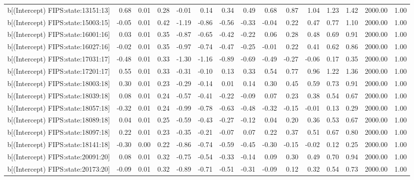 \begin{table}[ht]
\begin{tabular}{rrrrrrrrrrrrrrr}
  b[(Intercept) FIPS:state:13151:13] & 0.68 & 0.01 & 0.28 & -0.01 & 0.14 & 0.34 & 0.49 & 0.68 & 0.87 & 1.04 & 1.23 & 1.42 & 2000.00 & 1.00 \\ 
  b[(Intercept) FIPS:state:15003:15] & -0.05 & 0.01 & 0.42 & -1.19 & -0.86 & -0.56 & -0.33 & -0.04 & 0.22 & 0.47 & 0.77 & 1.10 & 2000.00 & 1.00 \\ 
  b[(Intercept) FIPS:state:16001:16] & 0.03 & 0.01 & 0.35 & -0.87 & -0.65 & -0.42 & -0.22 & 0.06 & 0.28 & 0.48 & 0.69 & 0.91 & 2000.00 & 1.00 \\ 
  b[(Intercept) FIPS:state:16027:16] & -0.02 & 0.01 & 0.35 & -0.97 & -0.74 & -0.47 & -0.25 & -0.01 & 0.22 & 0.41 & 0.62 & 0.86 & 2000.00 & 1.00 \\ 
  b[(Intercept) FIPS:state:17031:17] & -0.48 & 0.01 & 0.33 & -1.30 & -1.16 & -0.89 & -0.69 & -0.49 & -0.27 & -0.06 & 0.17 & 0.35 & 2000.00 & 1.00 \\ 
  b[(Intercept) FIPS:state:17201:17] & 0.55 & 0.01 & 0.33 & -0.31 & -0.10 & 0.13 & 0.33 & 0.54 & 0.77 & 0.96 & 1.22 & 1.36 & 2000.00 & 1.00 \\ 
  b[(Intercept) FIPS:state:18003:18] & 0.30 & 0.01 & 0.23 & -0.29 & -0.14 & 0.01 & 0.14 & 0.30 & 0.45 & 0.59 & 0.73 & 0.91 & 2000.00 & 1.00 \\ 
  b[(Intercept) FIPS:state:18039:18] & 0.08 & 0.01 & 0.24 & -0.57 & -0.41 & -0.22 & -0.09 & 0.07 & 0.23 & 0.38 & 0.54 & 0.67 & 2000.00 & 1.00 \\ 
  b[(Intercept) FIPS:state:18057:18] & -0.32 & 0.01 & 0.24 & -0.99 & -0.78 & -0.63 & -0.48 & -0.32 & -0.15 & -0.01 & 0.13 & 0.29 & 2000.00 & 1.00 \\ 
  b[(Intercept) FIPS:state:18089:18] & 0.04 & 0.01 & 0.25 & -0.59 & -0.43 & -0.27 & -0.12 & 0.04 & 0.20 & 0.36 & 0.53 & 0.67 & 2000.00 & 1.00 \\ 
  b[(Intercept) FIPS:state:18097:18] & 0.22 & 0.01 & 0.23 & -0.35 & -0.21 & -0.07 & 0.07 & 0.22 & 0.37 & 0.51 & 0.67 & 0.80 & 2000.00 & 1.00 \\ 
  b[(Intercept) FIPS:state:18141:18] & -0.30 & 0.00 & 0.22 & -0.86 & -0.74 & -0.59 & -0.45 & -0.30 & -0.15 & -0.02 & 0.12 & 0.25 & 2000.00 & 1.00 \\ 
  b[(Intercept) FIPS:state:20091:20] & 0.08 & 0.01 & 0.32 & -0.75 & -0.54 & -0.33 & -0.14 & 0.09 & 0.30 & 0.49 & 0.70 & 0.94 & 2000.00 & 1.00 \\ 
  b[(Intercept) FIPS:state:20173:20] & -0.09 & 0.01 & 0.32 & -0.89 & -0.71 & -0.51 & -0.31 & -0.09 & 0.12 & 0.32 & 0.54 & 0.73 & 2000.00 & 1.00 \\ 

\end{tabular}
\end{table}

